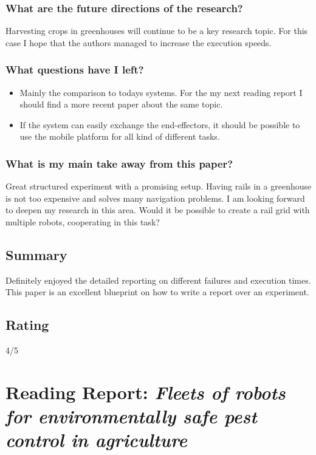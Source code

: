     \subsubsection*{What are the future directions of the research?}
    Harvesting crops in greenhouses will continue to be a key research topic. For this case I hope that the authors managed to increase the execution speeds.
    \subsubsection*{What questions have I left?} 
    \begin{itemize}
        \item Mainly the comparison to todays systems. For the my next reading report I should find a more recent paper about the same topic.
        \item If the system can easily exchange the end-effectors, it should be possible to use the mobile platform for all kind of different tasks.
    \end{itemize}
    \subsubsection*{What is my main take away from this paper?}
    Great structured experiment with a promising setup. Having rails in a greenhouse is not too expensive and solves many navigation problems. I am looking forward to deepen my research in this area.
    Would it be possible to create a rail grid with multiple robots, cooperating in this task?
    
    \subsection*{Summary}
    Definitely enjoyed the detailed reporting on different failures and execution times. This paper is an excellent blueprint on how to write a report over an experiment.
    
    
    \subsection*{Rating}
    4/5
    
    \newpage
    \section{Reading Report: \emph{Fleets of robots for environmentally safe pest control in agriculture}}
    \cite{deSantos2016}
    
